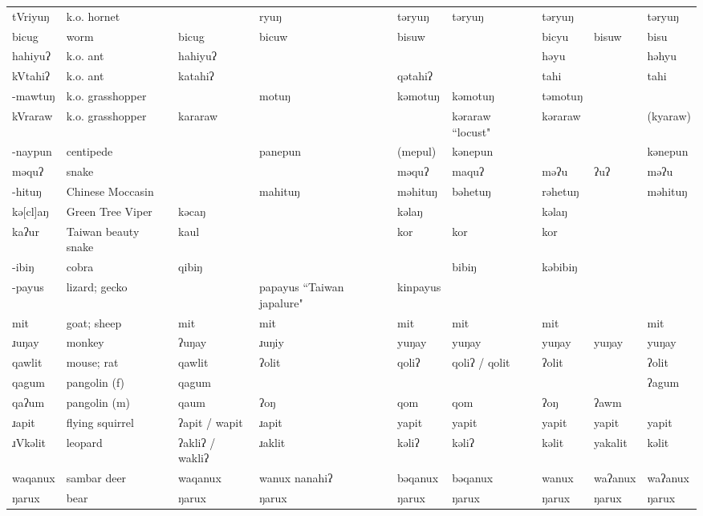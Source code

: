 \begin{landscape}
\begin{longtable}{*{9}{p{}}}
\text{*}tVriyuŋ & k.o. hornet &  & ryuŋ & təryuŋ & təryuŋ & təryuŋ &  & təryuŋ\\
\text{*}bicug & worm & bicug & bicuw & bisuw &  & bicyu & bisuw & bisu\\
\text{*}hahiyuʔ & k.o. ant & hahiyuʔ &  &  &  & həyu &  & həhyu\\
\text{*}kVtahiʔ & k.o. ant & katahiʔ &  & qətahiʔ &  & tahi &  & tahi\\
\text{*}-mawtuŋ & k.o. grasshopper &  & motuŋ & kəmotuŋ & kəmotuŋ & təmotuŋ &  & \\
\text{*}kVraraw & k.o. grasshopper & kararaw &  &  & kəraraw ``locust" & kəraraw &  & (kyaraw)\\
\text{*}-naypun & centipede &  & panepun & (mepul) & kənepun &  &  & kənepun\\
\text{*}məquʔ & snake &  &  & məquʔ & maquʔ & məʔu & ʔuʔ & məʔu\\
\text{*}-hituŋ & Chinese Moccasin &  & mahituŋ & məhituŋ & bəhetuŋ & rəhetuŋ &  & məhituŋ\\
\text{*}kə[cl]aŋ & Green Tree Viper & kəcaŋ &  & kəlaŋ &  & kəlaŋ &  & \\
\text{*}kaʔur & Taiwan beauty snake & kaul &  & kor & kor & kor &  & \\
\text{*}-ibiŋ & cobra & qibiŋ &  &  & bibiŋ & kəbibiŋ &  & \\
\text{*}-payus & lizard; gecko &  & papayus ``Taiwan japalure" & kinpayus &  &  &  & \\
\text{*}mit & goat; sheep & mit & mit & mit & mit & mit &  & mit\\
\text{*}ɹuŋay & monkey & ʔuŋay & ɹuŋiy & yuŋay & yuŋay & yuŋay & yuŋay & yuŋay\\
\text{*}qawlit & mouse; rat & qawlit & ʔolit & qoliʔ & qoliʔ / qolit & ʔolit &  & ʔolit\\
\text{*}qagum & pangolin (f) & qagum &  &  &  &  &  & ʔagum\\
\text{*}qaʔum & pangolin (m) & qaum & ʔoŋ & qom & qom & ʔoŋ & ʔawm & \\
\text{*}ɹapit & flying squirrel & ʔapit / wapit & ɹapit & yapit & yapit & yapit & yapit & yapit\\
\text{*}ɹVkəlit & leopard & ʔakliʔ / wakliʔ & ɹaklit & kəliʔ & kəliʔ & kəlit & yakalit & kəlit\\
\text{*}waqanux & sambar deer & waqanux & wanux nanahiʔ & bəqanux & bəqanux & wanux & waʔanux & waʔanux\\
\text{*}ŋarux & bear & ŋarux & ŋarux & ŋarux & ŋarux & ŋarux & ŋarux & ŋarux\\

\end{longtable}
\end{landscape}

